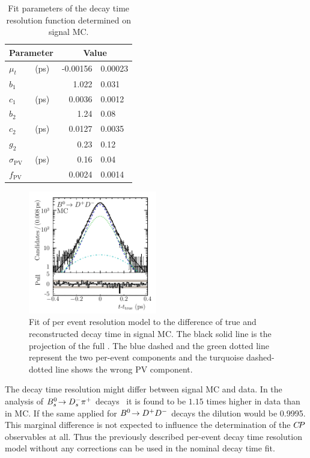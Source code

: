 \begin{table}[!htb]
\centering
\caption{Fit parameters of the decay time resolution function determined on \mbox{\BdToDD} signal MC.}
  \begin{tabular}{llr@{$\,\pm\,$}l}
    \toprule
    \multicolumn{2}{c}{Parameter}       &   \multicolumn{2}{c}{Value} \\
    \midrule
    $\mu_t$             &   (\si{\ps})  &   -0.00156    &   0.00023               \\
    $b_{1}$             &               &   1.022       &   0.031                 \\
    $c_{1}$             &   (\si{\ps})  &   0.0036      &   0.0012                \\
    $b_{2}$             &               &   1.24        &   0.08                  \\
    $c_{2}$             &   (\si{\ps})  &   0.0127      &   0.0035                \\
    $g_{2}$             &               &   0.23        &   0.12                  \\
    $\sigma_\text{PV}$  &   (\si{\ps})  &   0.16        &   0.04                  \\
    $f_\text{PV}$       &               &   0.0024      &   0.0014                \\
    \bottomrule
  \end{tabular}
\label{tab:b02dd:decaytimefit:resolution}
\end{table}
%
\begin{figure}[!htb]
\centering
\includegraphics[width=0.5\textwidth]{07-B02DD/tikz/pdf/obsTimeErr_True_pull_logy.pdf}
\caption{Fit of per event resolution model to the difference of true and
reconstructed decay time in signal MC. The black solid line is the projection of the full
\PDF. The blue dashed and the green dotted line represent the two per-event
components and the turquoise dashed-dotted line shows the wrong PV component.}
\label{fig:b02dd:decaytimefit:resolution}
\end{figure}
%
The decay time resolution might differ between signal MC and data. In the
analysis of ${{B}^0_{s}}\!\rightarrow {\ensuremath{{D}^-_{s}}}{\ensuremath{{\pi}^+}}$ decays~\cite{LHCb-ANA-2012-068} it is found to be
$\num{1.15}$ times higher in data than in MC. If the same applied for ${{B}^0}\!\rightarrow {\ensuremath{{D}^+}}{\ensuremath{{D}^-}}$
decays the dilution would be \num{0.9995}. This marginal difference is not expected
to influence the determination of the ${C\!P}$ observables at all. Thus the
previously described per-event decay time resolution model without any
corrections can be used in the nominal decay time fit.
